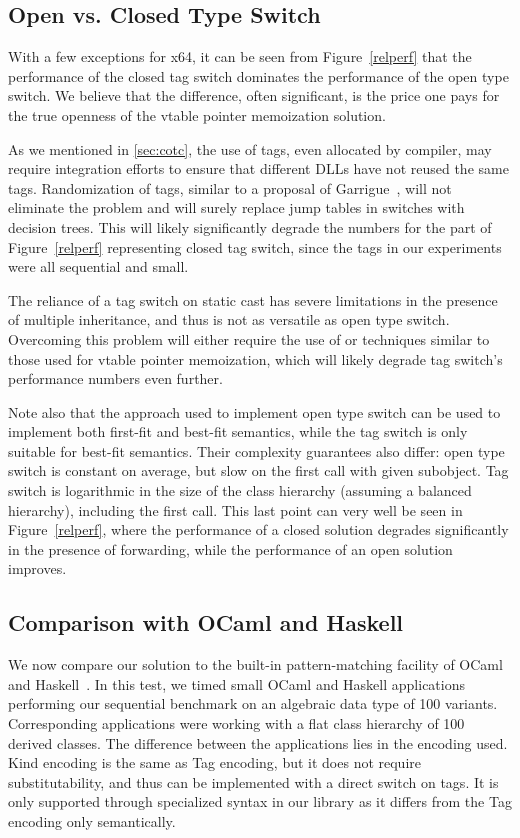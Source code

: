 \subsection{Open vs. Closed Type Switch}
\label{sec:cmp}

With a few exceptions for x64, it can be seen from Figure~\ref{relperf} 
that the performance of the closed tag switch dominates the performance of the 
open type switch. We believe that the difference, often significant, is the 
price one pays for the true openness of the vtable pointer memoization solution. 

As we mentioned in \textsection\ref{sec:cotc}, the use of tags, even allocated 
by compiler, may require integration efforts to ensure that different DLLs have 
not reused the same tags. Randomization of tags, similar to a proposal of 
Garrigue~\cite{garrigue-98}, will not eliminate the problem and will surely 
replace jump tables in switches with decision trees. This will likely 
significantly degrade the numbers for the part of Figure~\ref{relperf} 
representing closed tag switch, since the tags in our experiments were all 
sequential and small. 

The reliance of a tag switch on static cast has severe limitations in the 
presence of multiple inheritance, and thus is not as versatile as open type 
switch. Overcoming this problem will either require the use of 
 or techniques similar to those used for vtable pointer 
memoization, which will likely degrade tag switch's performance numbers even 
further.

Note also that the approach used to implement open type switch can be used to 
implement both first-fit and best-fit semantics, while the tag switch is only suitable 
for best-fit semantics. Their complexity guarantees also differ: open type 
switch is constant on average, but slow on the first call with given subobject. 
Tag switch is logarithmic in the size of the class hierarchy 
(assuming a balanced hierarchy), including the first call. This last point can 
very well be seen in Figure~\ref{relperf}, where the performance of a closed solution
degrades significantly in the presence of forwarding, while the performance of an
open solution improves.

\subsection{Comparison with OCaml and Haskell}
\label{sec:ocaml}

We now compare our solution to the built-in pattern-matching facility of 
OCaml~\cite{OPM01} and Haskell~\cite{Haskell98Book}.  
In this test, we timed small OCaml and Haskell applications performing our sequential 
benchmark on an algebraic data type of 100 variants. Corresponding \Cpp{} 
applications were working with a flat class hierarchy of 100 derived classes. 
The difference between the \Cpp{} applications lies in the encoding used. Kind 
encoding is the same as Tag encoding, but it does not require substitutability, 
and thus can be implemented with a direct switch on tags. It is only supported 
through specialized syntax in our library as it differs from the Tag encoding 
only semantically.

